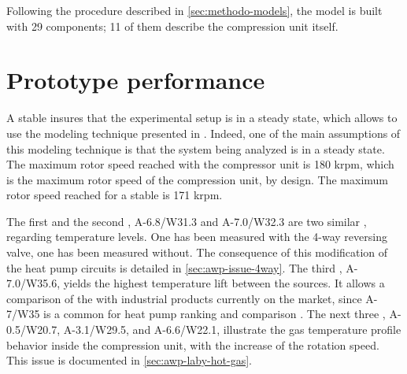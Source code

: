 Following the procedure described in \cref{sec:methodo-models}, the
model is built with 29 components; 11 of them describe the compression
unit itself.

\section{Prototype performance}
\label{sec:awp-perfs}

A stable \OP{} insures that the experimental setup is in a steady
state, which allows to use the modeling technique presented in
. Indeed, one of the main assumptions of
this modeling technique is that the system being analyzed is in a
steady state. The maximum rotor speed reached with the compressor unit is 180
krpm, which is the maximum rotor speed of the compression unit, by
design. The maximum rotor speed reached for a stable \OP{} is 171
krpm.

The first and the second \OP{}, A-6.8/W31.3 and A-7.0/W32.3 are two
similar \OP{}, regarding temperature
levels. One has been measured with the 4-way reversing valve, one has
been measured without. The consequence of this modification of the
heat pump circuits is detailed in \cref{sec:awp-issue-4way}. The third
\OP{}, A-7.0/W35.6, yields the
highest temperature lift between the sources. It allows a comparison
of the \AWP{} with industrial products currently on the market, since
A-7/W35 is a common \OP{} for heat pump ranking and
comparison \citep{EN-14511-3}. The next three \OP{}, A-0.5/W20.7, A-3.1/W29.5,
and A-6.6/W22.1, illustrate the gas temperature profile behavior
inside the compression unit, with the increase of the rotation
speed. This issue is documented in \cref{sec:awp-laby-hot-gas}.

